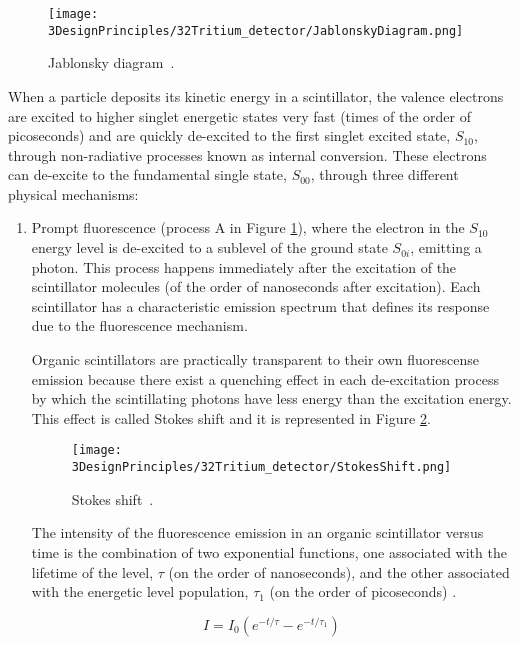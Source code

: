 \begin{figure}[htbp]
\centering
\texttt{[image: 3DesignPrinciples/32Tritium\_detector/JablonskyDiagram.png]}
\caption{Jablonsky diagram\label{fig:JablonskyDiagram}~\cite{Knoll}.}
\end{figure}

When a particle deposits its kinetic energy in a scintillator, the valence electrons are excited to higher singlet energetic states very fast (times of the order of picoseconds) and are quickly de-excited to the first singlet excited state, $S_{10}$, through non-radiative processes known as internal conversion. These electrons can de-excite to the fundamental single state, $S_{00}$, through three different physical mechanisms:

\begin{enumerate}

\item{} Prompt fluorescence (process A in Figure \ref{fig:JablonskyDiagram}), where the electron in the $S_{10}$ energy level  is de-excited to a sublevel of the ground state $S_{0i}$, emitting a photon. This process happens immediately after the excitation of the scintillator molecules (of the order of nanoseconds after excitation). Each scintillator has a characteristic emission spectrum that defines its response due to the fluorescence mechanism. 

Organic scintillators are practically transparent to their own fluorescense emission because there exist a quenching effect in each de-excitation process by which the scintillating photons have less energy than the excitation energy. This effect is called Stokes shift and it is represented in Figure \ref{fig:StokesShift}.

\begin{figure}[htbp]
\centering
\texttt{[image: 3DesignPrinciples/32Tritium\_detector/StokesShift.png]}
\caption{Stokes shift\label{fig:StokesShift}~\cite{Knoll}.}
\end{figure}

The intensity of the fluorescence emission in an organic scintillator versus time is the combination of two exponential functions, one associated with the lifetime of the level, $\tau$ (on the order of nanoseconds), and the other associated with the energetic level population, $\tau_1$ (on the order of picoseconds) \cite{Knoll}.

\begin{equation}
I=I_0\left(e^{-t/\tau} - e^{-t/\tau_1}\right) 
\label{eq:IntensityTimeScintillator}
\end{equation}


\end{enumerate}
